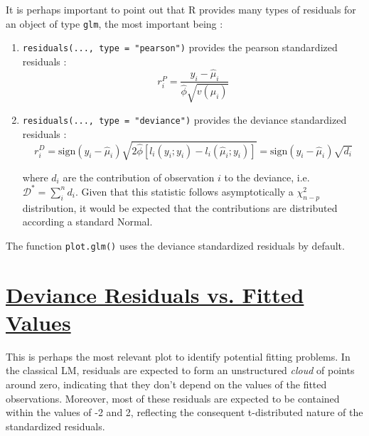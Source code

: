\documentclass[a4paper,12pt]{article}\usepackage[]{graphicx}\usepackage[]{color}
\def\op{\left(}
\def\cp{\right)}
\def\oc{\left[}
\def\cc{\right]}
\begin{document}

It is perhaps important to point out that R provides many types of residuals for an object of type \texttt{glm}, the most important being : 
\begin{enumerate}
  \item \texttt{residuals(..., type = "pearson")} provides the pearson standardized residuals : 
    \begin{equation}r^P_{i} = \frac{y_i-\hat{\mu}_i}{\hat{\phi}\sqrt{v\op\hat{\mu}_i\cp}} \label{eq:pearsonres}\end{equation}
  \item \texttt{residuals(..., type = "deviance")} provides the deviance standardized residuals : 
    \begin{equation} r^D_{i} = \mathrm{sign}\op y_i-\hat{\mu}_i\cp\sqrt{2\hat{\phi}\oc l_i(y_i;y_i) - l_i(\hat{\mu}_i; y_i)\cc} =\mathrm{sign}\op y_i-\hat{\mu}_i\cp\sqrt{d_i} \label{eq:devianceres} \end{equation}
    
    where $d_i$ are the contribution of observation $i$ to the deviance, i.e. $\mathcal{D}^* = \sum_i^n d_i$. Given that this statistic follows asymptotically a $\chi_{n-p}^2$ distribution, it would be expected that the contributions are distributed according a standard Normal. 
\end{enumerate}

The function \texttt{plot.glm()} uses the deviance standardized residuals by default. 


\section{\underline{Deviance Residuals vs. Fitted Values}}

This is perhaps the most relevant plot to identify potential fitting problems. In the classical LM, residuals are expected to form an unstructured \emph{cloud} of points around zero, indicating that they don't depend on the values of the fitted observations. Moreover, most of these residuals are expected to be contained within the values of -2 and 2, reflecting the consequent t-distributed nature of the standardized residuals.
\end{document}
